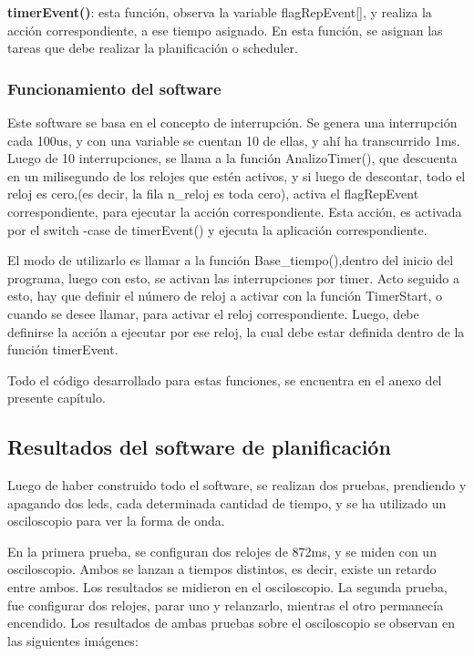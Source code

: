 \textbf{timerEvent()}: esta función, observa la variable flagRepEvent[], y realiza la acción correspondiente, a ese tiempo asignado. En esta función, se asignan las tareas que debe realizar la planificación o scheduler.

\subsubsection{Funcionamiento del software} 

Este software se basa en el concepto de interrupción. Se genera una interrupción cada 100us, y con una variable se cuentan 10 de ellas, y ahí ha transcurrido 1ms. Luego de 10 interrupciones, se llama a la función AnalizoTimer(), que descuenta en un milisegundo de los relojes que estén activos, y si luego de descontar, todo el reloj es cero,(es decir, la fila n\_reloj es toda cero), activa el flagRepEvent correspondiente, para ejecutar la acción correspondiente. Esta acción, es activada por el switch -case de timerEvent() y ejecuta la aplicación correspondiente. 

El modo de utilizarlo es llamar a la función Base\_tiempo(),dentro del inicio del programa, luego con esto, se activan las interrupciones por timer. Acto seguido a esto, hay que definir el número de reloj a activar con la función TimerStart, o cuando se desee llamar, para activar el reloj correspondiente. Luego, debe definirse la acción a ejecutar por ese reloj, la cual debe estar definida dentro de la función timerEvent. 

Todo el código desarrollado para estas funciones, se encuentra en el anexo del presente capítulo. 



\subsection{Resultados del software de planificación}

Luego de haber construido todo el software, se realizan dos pruebas, prendiendo y apagando dos leds, cada determinada cantidad de tiempo, y se ha utilizado un osciloscopio para ver la forma de onda.
 
En la primera prueba, se configuran dos relojes de 872ms, y se miden con un osciloscopio. Ambos se lanzan a tiempos distintos, es decir, existe un retardo entre ambos. Los resultados se midieron en el osciloscopio. La segunda prueba, fue configurar dos relojes, parar uno y relanzarlo, mientras el otro permanecía encendido. Los resultados de ambas pruebas sobre el osciloscopio se observan en las siguientes imágenes: 


